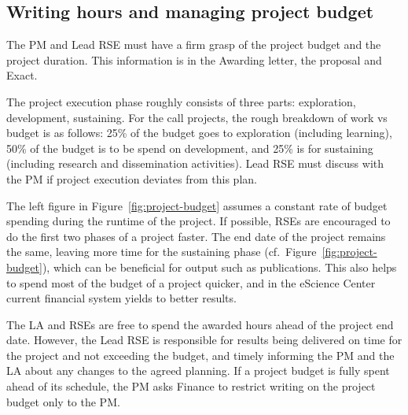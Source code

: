 \subsection{Writing hours and managing project budget}
\label{sec:exec:budget}
The PM and Lead RSE must have a firm grasp of the project budget and the project duration. This information is in the
Awarding letter, the proposal and Exact.

The project execution phase roughly consists of three parts: exploration, development, sustaining.
For the call projects, the rough breakdown of work vs budget is as follows: 25\% of the budget goes to
exploration (including learning), 50\% of the budget is to be spend on development, and 25\% is for sustaining (including research
and dissemination activities). Lead RSE must discuss with the PM if project execution deviates from this plan.

The left figure in Figure~\ref{fig:project-budget} assumes a constant rate of budget spending during the runtime of the project. If possible, RSEs are encouraged 
to do the first two phases of a project faster. The end date of the project remains the same, leaving more time for the sustaining phase (cf.~Figure~\ref{fig:project-budget}),
which can be beneficial for output such as publications. This also helps to spend most of the budget of a project quicker, and in the eScience Center current financial system yields to better results.

The LA and RSEs are free to spend the awarded hours ahead of the project end date. However, the Lead RSE is responsible 
for results being delivered on time for the project and not exceeding the budget, and timely informing the PM and the LA 
about any changes to the agreed planning. If a project budget is fully spent ahead of its schedule, the PM asks Finance to restrict writing on the
project budget only to the PM.

